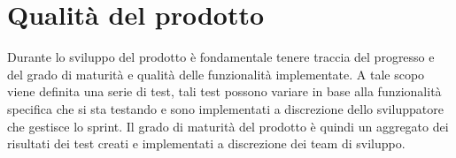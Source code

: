 \section{Qualità del prodotto}
Durante lo sviluppo del prodotto è fondamentale tenere traccia del progresso e del grado di maturità e qualità delle funzionalità implementate.
A tale scopo viene definita una serie di test, tali test possono variare in base alla funzionalità specifica che si sta testando e sono implementati a discrezione dello sviluppatore che gestisce lo sprint.
Il grado di maturità del prodotto è quindi un aggregato dei risultati dei test creati e implementati a discrezione dei team di sviluppo.
